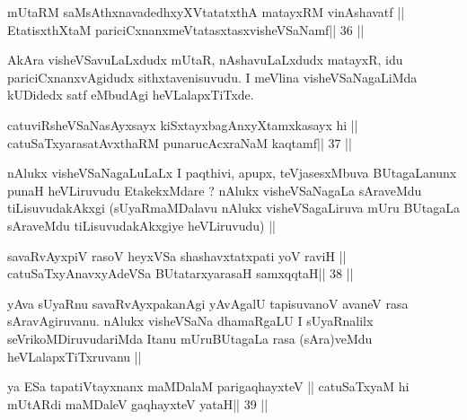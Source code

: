 

\begin{shl}
mUtaRM saMsAthxnavadedhxyXVtatatxthA matayxRM vinAshavatf ||
EtatisxthXtaM pariciCxnanxmeVtatasxtasxvisheVSaNamf\hfill || 36 ||
\end{shl}

\begin{artha}
AkAra visheVSavuLaLxdudx mUtaR, nAshavuLaLxdudx matayxR, idu
pariciCxnanxvAgidudx sithxtavenisuvudu. I meVlina visheVSaNagaLiMda
kUDidedx satf eMbudAgi heVLalapxTiTxde.
\end{artha}



\begin{shl}
\footnotemark[1]catuviRsheVSaNasAyxsayx kiSxtayxbagAnxyXtamxkasayx hi ||
\footnotemark[1]catuSaTxyarasatAvxthaRM punarucAcxraNaM kaqtamf\hfill || 37 ||
\end{shl}

\begin{artha}
nAlukx visheVSaNagaLuLaLx I paqthivi, apupx, teVjasesxMbuva BUtagaLanunx
punaH heVLiruvudu EtakekxMdare ? nAlukx visheVSaNagaLa sAraveMdu
tiLisuvudakAkxgi  (sUyaRmaMDalavu nAlukx visheVSagaLiruva mUru
BUtagaLa sAraveMdu tiLisuvudakAkxgiye heVLiruvudu) ||
\end{artha}



\begin{shl}
savaRvAyxpiV rasoV heyxVSa shashavxtatxpati yoV raviH ||
\footnotemark[1]catuSaTxyAnavxyAdeVSa BUtatarxyarasaH samxqqtaH\hfill || 38 ||
\end{shl}

\begin{artha}
yAva sUyaRnu savaRvAyxpakanAgi yAvAgalU tapisuvanoV avaneV rasa
sAravAgiruvanu. nAlukx visheVSaNa dhamaRgaLU I sUyaRnalilx
seVrikoMDiruvudariMda Itanu mUruBUtagaLa rasa (sAra)veMdu
heVLalapxTiTxruvanu ||
\end{artha}



\begin{shl}
ya ESa tapatiVtayxnanx maMDalaM parigaqhayxteV ||
catuSaTxyaM hi mUtARdi maMDaleV gaqhayxteV yataH\hfill || 39 ||
\end{shl}

